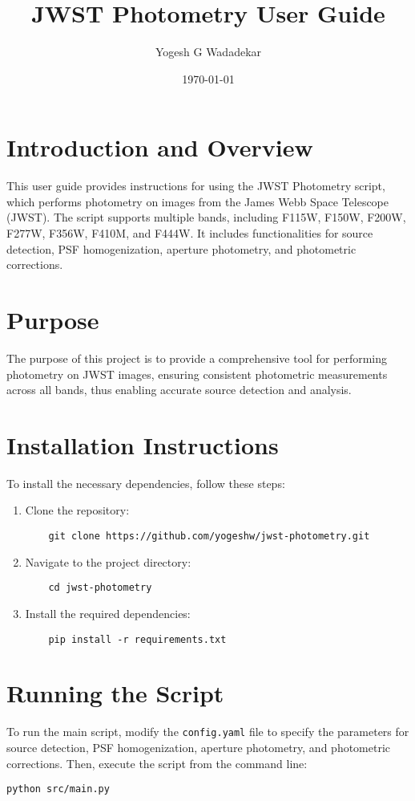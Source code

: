 \documentclass{article}
\title{JWST Photometry User Guide}
\author{Yogesh G Wadadekar}
\date{\today}
\begin{document}
\maketitle

\section{Introduction and Overview}
This user guide provides instructions for using the JWST Photometry script, which performs photometry on images from the James Webb Space Telescope (JWST). The script supports multiple bands, including F115W, F150W, F200W, F277W, F356W, F410M, and F444W. It includes functionalities for source detection, PSF homogenization, aperture photometry, and photometric corrections.


\section{Purpose}
The purpose of this project is to provide a comprehensive tool for performing photometry on JWST images, ensuring consistent photometric measurements across all bands, thus enabling accurate source detection and analysis.

\section{Installation Instructions}
To install the necessary dependencies, follow these steps:
\begin{enumerate}
    \item Clone the repository:
    \begin{verbatim}
    git clone https://github.com/yogeshw/jwst-photometry.git
    \end{verbatim}
    \item Navigate to the project directory:
    \begin{verbatim}
    cd jwst-photometry
    \end{verbatim}
    \item Install the required dependencies:
    \begin{verbatim}
    pip install -r requirements.txt
    \end{verbatim}
\end{enumerate}

\section{Running the Script}
To run the main script, modify the \texttt{config.yaml} file to specify the parameters for source detection, PSF homogenization, aperture photometry, and photometric corrections. Then, execute the script from the command line:
\begin{verbatim}
python src/main.py
\end{verbatim}
\end{document}
